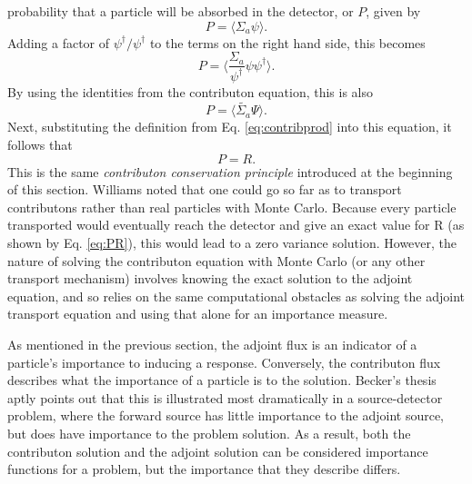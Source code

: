 probability that a particle will be absorbed in the detector, or $P$, given by
\begin{equation}
  P  = \langle \Sigma_a \psi \rangle.
\end{equation}
Adding a factor of $\psi^{\dagger}/\psi^{\dagger}$ to the terms on the right hand
side, this becomes
\begin{equation}
  P = \Big \langle \frac{\Sigma_a}{\psi^{\dagger}} \psi \psi^{\dagger} \Big
  \rangle.
\end{equation}
By using the identities from the contributon equation, this is also
\begin{equation}
  P = \langle \widetilde{\Sigma_a} \Psi \rangle .
\end{equation}
Next, substituting the definition from Eq. \eqref{eq:contribprod} into this
equation, it follows that
\begin{equation}
  P = R.
  \label{eq:PR}
\end{equation}
This is the same
\textit{contributon conservation principle} introduced at the beginning of this
section.
Williams noted that one could
go so far as to transport contributons rather than real particles with Monte Carlo.
Because every particle transported would eventually reach the detector and give
an exact value for R (as shown by Eq. \eqref{eq:PR}), this
would lead to a zero variance solution. However, the nature of solving the
contributon equation with Monte Carlo (or any other transport mechanism)
involves knowing the exact solution to the adjoint equation, and so relies on
the same computational obstacles as solving the adjoint transport equation and
using that alone for an importance measure.

As mentioned in the previous section, the adjoint flux is an indicator of a
particle's importance to inducing a response. Conversely, the contributon
flux describes what the importance of a particle is to the solution.
Becker's thesis \cite{becker_hybrid_2009} aptly points out that this is
illustrated most dramatically in a source-detector problem, where the forward
source has little importance to the adjoint source, but does have importance to
the problem solution. As a result, both the contributon solution and the adjoint
solution can be considered importance functions for a problem, but the
importance that they describe differs.

